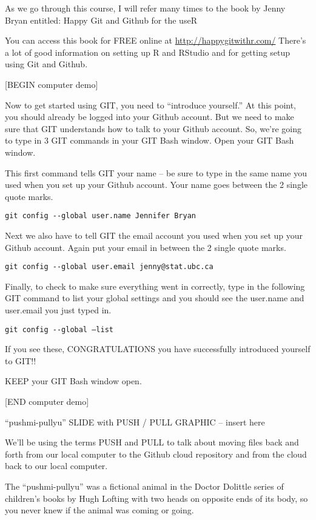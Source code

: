 \documentclass[]{book}
\theoremstyle{definition}
\theoremstyle{definition}
\theoremstyle{definition}
\theoremstyle{remark}
\begin{document}
As we go through this course, I will refer many times to the book by
Jenny Bryan entitled: Happy Git and Github for the useR

You can access this book for FREE online at
\url{http://happygitwithr.com/} There's a lot of good information on
setting up R and RStudio and for getting setup using Git and Github.

{[}BEGIN computer demo{]}

Now to get started using GIT, you need to ``introduce yourself.'' At
this point, you should already be logged into your Github account. But
we need to make sure that GIT understands how to talk to your Github
account. So, we're going to type in 3 GIT commands in your GIT Bash
window. Open your GIT Bash window.

This first command tells GIT your name -- be sure to type in the same
name you used when you set up your Github account. Your name goes
between the 2 single quote marks.

\texttt{git\ config\ -\/-global\ user.name\ \textquotesingle{}Jennifer\ Bryan\textquotesingle{}}

Next we also have to tell GIT the email account you used when you set up
your Github account. Again put your email in between the 2 single quote
marks.

\texttt{git\ config\ -\/-global\ user.email\ \textquotesingle{}jenny@stat.ubc.ca\textquotesingle{}}

Finally, to check to make sure everything went in correctly, type in the
following GIT command to list your global settings and you should see
the user.name and user.email you just typed in.

\texttt{git\ config\ -\/-global\ –list}

If you see these, CONGRATULATIONS you have successfully introduced
yourself to GIT!!

KEEP your GIT Bash window open.

{[}END computer demo{]}

``pushmi-pullyu'' SLIDE with PUSH / PULL GRAPHIC -- insert here

We'll be using the terms PUSH and PULL to talk about moving files back
and forth from our local computer to the Github cloud repository and
from the cloud back to our local computer.

The ``pushmi-pullyu'' was a fictional animal in the Doctor Dolittle
series of children's books by Hugh Lofting with two heads on opposite
ends of its body, so you never knew if the animal was coming or going.
\end{document}
